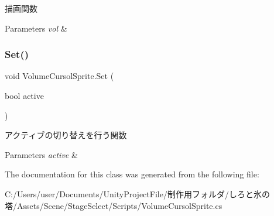 描画関数 


\begin{DoxyParams}{Parameters}
{\em vol} & \\
\hline
\end{DoxyParams}
\mbox{\label{class_volume_cursol_sprite_a18da757108eb820eb53bfc460693a273}} 
\subsubsection{\texorpdfstring{Set()}{Set()}}
{\footnotesize\ttfamily void Volume\+Cursol\+Sprite.\+Set (\begin{DoxyParamCaption}\item[{bool}]{active }\end{DoxyParamCaption})\hspace{0.3cm}{\ttfamily [inline]}}



アクティブの切り替えを行う関数 


\begin{DoxyParams}{Parameters}
{\em active} & \\
\hline
\end{DoxyParams}


The documentation for this class was generated from the following file\+:\begin{DoxyCompactItemize}
\item 
C\+:/\+Users/user/\+Documents/\+Unity\+Project\+File/制作用フォルダ/しろと氷の塔/\+Assets/\+Scene/\+Stage\+Select/\+Scripts/Volume\+Cursol\+Sprite.\+cs\end{DoxyCompactItemize}
